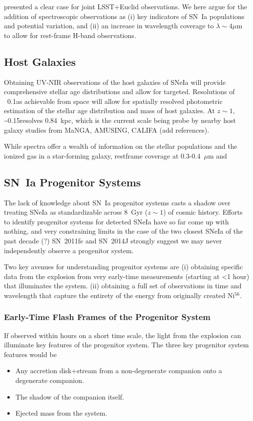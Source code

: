 \citet{Astier16} presented a clear case for joint LSST+Euclid observations.  We here argue for the addition of spectroscopic observations as (i) key indicators of SN~Ia populations and potential variation, and (ii) an increase in wavelength coverage to $\lambda\sim4\mu$m to allow for rest-frame H-band observations.

\subsection{Host Galaxies}

Obtaining UV-NIR observations of the host galaxies of SNeIa will provide comprehensive stellar age distributions and allow for targeted.  Resolutions of ~0.1\arcsec as achievable from space will allow for spatially resolved photometric estimation of the stellar age distribution and mass of host galaxies.  At $z\sim1$, \sim0.15\arcsec resolves 0.84~kpc, which is the current scale being probe by nearby host galaxy studies from MaNGA, AMUSING, CALIFA (\tbd add references).

While spectra offer a wealth of information on the stellar populations and the ionized gas in a star-forming galaxy, restframe coverage at 0.3-0.4~$\mu$m and

\subsection{SN~Ia Progenitor Systems}

The lack of knowledge about SN~Ia progenitor systems casts a shadow over treating SNeIa as standardizable across 8~Gyr ($z\sim1$) of cosmic history.  Efforts to identify progenitor systems for detected SNeIa have so far come up with nothing, and very constraining limits in the case of the two closest SNeIa of the past decade (?) SN~2011fe \citep{??} and SN~2014J \citep{??} strongly suggest we may never independently observe a progenitor system.

Two key avenues for understanding progenitor systems are 
(i) obtaining specific data from the explosion from very early-time measurements (starting at <1 hour) that illuminates the system.
(ii) obtaining a full set of observations in time and wavelength that capture the entirety of the energy from originally created Ni$^{56}$.

\subsubsection{Early-Time Flash Frames of the Progenitor System}
If observed within hours on a short time scale, the light from the explosion can illuminate key features of the progenitor system.  The three key progenitor system features would be 
\begin{itemize}
\item Any accretion disk+stream from a non-degenerate companion onto a degenerate companion.
\item The shadow of the companion itself.
\item Ejected mass from the system.
\end{itemize}

